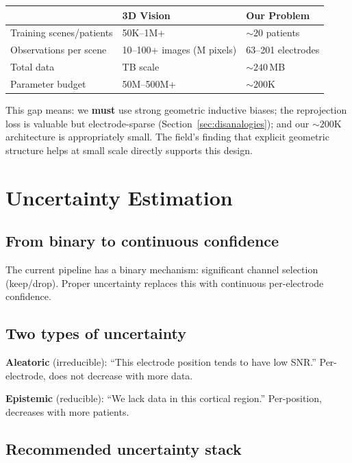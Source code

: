 \documentclass[11pt,letterpaper]{article}
\begin{document}
\begin{table}[ht!]\centering\small
\begin{tabular}{@{}lll@{}}
\toprule
& \textbf{3D Vision} & \textbf{Our Problem} \\
\midrule
Training scenes/patients & 50K--1M+ & ${\sim}20$ patients \\
Observations per scene & 10--100+ images (M pixels) & 63--201 electrodes \\
Total data & TB scale & ${\sim}240$\,MB \\
Parameter budget & 50M--500M+ & ${\sim}200$K \\
\bottomrule
\end{tabular}
\end{table}

\noindent This gap means: we \textbf{must} use strong geometric inductive biases; the reprojection loss is valuable but electrode-sparse (Section~\ref{sec:disanalogies}); and our ${\sim}200$K architecture is appropriately small. The field's finding that explicit geometric structure helps at small scale directly supports this design.


\section{Uncertainty Estimation}\label{sec:uncertainty}

\subsection{From binary to continuous confidence}

The current pipeline has a binary mechanism: significant channel selection (keep/drop). Proper uncertainty replaces this with continuous per-electrode confidence.

\subsection{Two types of uncertainty}

\textbf{Aleatoric} (irreducible): ``This electrode position tends to have low SNR.'' Per-electrode, does not decrease with more data.

\textbf{Epistemic} (reducible): ``We lack data in this cortical region.'' Per-position, decreases with more patients.

\subsection{Recommended uncertainty stack}
\end{document}
